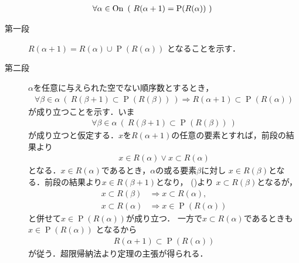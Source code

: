 	\begin{screen}
		\begin{thm}
			\begin{align}\label{thm:R_alpha_plus_1_equals_to_power_of_R_alpha}
				\forall \alpha \in \ON\ 
				\left(\ R(\alpha + 1) = \operatorname{P}(R(\alpha))\ \right)
			\end{align}
		\end{thm}
	\end{screen}
	
	\begin{prf}\mbox{}
		\begin{description}
			\item[第一段] $R(\alpha + 1) = R(\alpha) \cup \operatorname{P}(R(\alpha))$
				となることを示す．
				
			\item[第二段] $\alpha$を任意に与えられた空でない順序数とするとき，
				\begin{align}
					\forall \beta \in \alpha\ 
					\left(\ R(\beta + 1) \subset \operatorname{P}(R(\beta))\ \right)
					\Longrightarrow R(\alpha + 1) \subset \operatorname{P}(R(\alpha))
				\end{align}
				が成り立つことを示す．いま
				\begin{align}
					\forall \beta \in \alpha\ 
					\left(\ R(\beta + 1) \subset \operatorname{P}(R(\beta))\ \right)
					\label{eq:thm_R_alpha_plus_1_equals_to_power_of_R_alpha}
				\end{align}
				が成り立つと仮定する．$x$を$R(\alpha + 1)$の任意の要素とすれば，前段の結果より
				\begin{align}
					x \in R(\alpha) \vee x \subset R(\alpha)
				\end{align}
				となる．$x \in R(\alpha)$であるとき，$\alpha$の或る要素$\beta$に対し
				$x \in R(\beta)$となる．前段の結果より$x \in R(\beta + 1)$となり，
				()より
				$x \subset R(\beta)$となるが，
				\begin{align}
					x \subset R(\beta) &\Longrightarrow x \subset R(\alpha), \\
					x \subset R(\alpha) &\Longrightarrow x \in \operatorname{P}(R(\alpha))
				\end{align}
				と併せて$x \in \operatorname{P}(R(\alpha))$が成り立つ．
				一方で$x \subset R(\alpha)$であるときも$x \in \operatorname{P}(R(\alpha))$
				となるから
				\begin{align}
					R(\alpha + 1) \subset \operatorname{P}(R(\alpha))
				\end{align}
				が従う．超限帰納法より定理の主張が得られる．
		\end{description}
	\end{prf}
	
